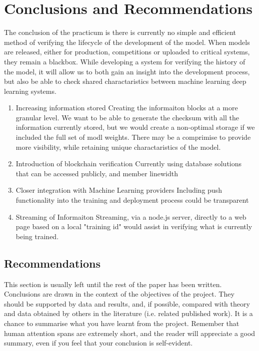 \section{Conclusions and Recommendations}

The conclusion of the practicum is there is currently no simple and efficient method of verifying the lifecycle of the development of the model. When models are released, either for production, competitions or uploaded to critical systems, they remain a blackbox. While developing a system for verifying the history of the model, it will allow us to both gain an insight into the development process, but also be able to check shared charactaristics between machine learning deep learning systems.

\begin{enumerate}
    \item 
    Increasing information stored
    Creating the informaiton blocks at a more granular level. We want to be able to generate the checksum with all the information currently stored, but we would create a non-optimal storage if we included the full set of modl weights. There may be a comprimise to provide more visibility, while retaining unique charactaristics of the model.
    
    \item 
    Introduction of blockchain verification
    Currently using database solutions that can be accessed publicly, and member linewidth
    
    \item 
    Closer integration with Machine Learning providers
    Including push functionality into the training and deployment process could be transparent
    
    \item 
    Streaming of Informaiton
    Streaming, via a node.js server, directly to a web page based on a local "training id" would assist in verifying what is currently being trained.
\end{enumerate}


\subsection{Recommendations}


This section is usually left until the rest of the paper has been written. Conclusions are drawn in the context of the objectives of the project. They should be supported by data and results, and, if possible, compared with theory and data obtained by others in the literature (i.e. related published work). It is a chance to summarise what you have learnt from the project. Remember that human attention spans are extremely short, and the reader will appreciate a good summary, even if you feel that your conclusion is self-evident.

